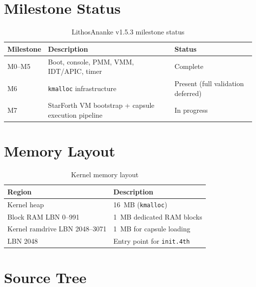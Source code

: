 \section{Milestone Status}
\label{vol2:sec:kernel:milestones}


\begin{table}[ht]
  \centering
  \caption{LithosAnanke v1.5.3 milestone status}
  \label{tab:milestones}
  \begin{tabular}{lll}
    \toprule
    Milestone & Description & Status \\
    \midrule
    M0--M5 & Boot, console, PMM, VMM, IDT/APIC, timer & Complete \\
    M6 & \texttt{kmalloc} infrastructure & Present (full validation deferred) \\
    M7 & StarForth VM bootstrap + capsule execution pipeline & In progress \\
    \bottomrule
  \end{tabular}
\end{table}

\section{Memory Layout}
\label{vol2:sec:kernel:memory}


\begin{table}[ht]
  \centering
  \caption{Kernel memory layout}
  \label{tab:kernel-memory}
  \begin{tabular}{ll}
    \toprule
    Region & Description \\
    \midrule
    Kernel heap & 16~MB (\texttt{kmalloc}) \\
    Block RAM LBN 0--991 & 1~MB dedicated RAM blocks \\
    Kernel ramdrive LBN 2048--3071 & 1~MB for capsule loading \\
    LBN 2048 & Entry point for \texttt{init.4th} \\
    \bottomrule
  \end{tabular}
\end{table}

\section{Source Tree}
\label{vol2:sec:kernel:source}

